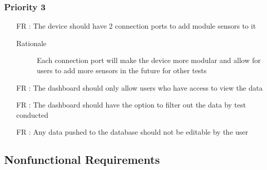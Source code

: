 \documentclass[12pt,titlepage]{article}
\newcounter{reqnum} %
\begin{document}
\subsubsection{Priority 3}
\begin{itemize}
  \item[FR \refstepcounter{reqnum}\thereqnum:] The device should have 2 connection ports to add module sensors to it
  \begin{description} \item[Rationale] Each connection port will make the device more modular and allow for users to add more sensors in the future for other tests  \end{description}

  \item[FR \refstepcounter{reqnum}\thereqnum:] The dashboard should only allow users who have access to view the data
  
  \item[FR \refstepcounter{reqnum}\thereqnum:] The dashboard should have the option to filter out the data by test conducted
  
  \item[FR \refstepcounter{reqnum}\thereqnum:] Any data pushed to the database should not be editable by the user
  
  
  \end{itemize}

\newpage
\subsection{Nonfunctional Requirements}
\end{document}
